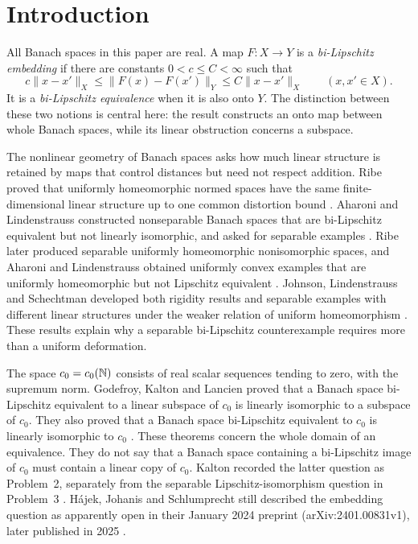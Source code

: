 \section{Introduction}\label{sec:introduction}

All Banach spaces in this paper are real. A map \(F:X\to Y\) is a
\emph{bi-Lipschitz embedding} if there are constants
\(0<c\leq C<\infty\) such that
\[
 c\|x-x'\|_X\leq\|F(x)-F(x')\|_Y
       \leq C\|x-x'\|_X\qquad(x,x'\in X).
\]
It is a \emph{bi-Lipschitz equivalence} when it is also onto \(Y\).
The distinction between these two notions is central here: the result
constructs an onto map between whole Banach spaces, while its linear
obstruction concerns a subspace.

The nonlinear geometry of Banach spaces asks how much linear structure
is retained by maps that control distances but need not respect
addition. Ribe proved that uniformly homeomorphic normed spaces have
the same finite-dimensional linear structure up to one common
distortion bound \cite[Theorem~1]{Ribe76}. Aharoni and Lindenstrauss
constructed nonseparable Banach spaces that are bi-Lipschitz equivalent
but not linearly isomorphic, and asked for separable examples
\cite[pp.~281--282]{AL78}. Ribe later produced separable uniformly
homeomorphic nonisomorphic spaces, and Aharoni and Lindenstrauss
obtained uniformly convex examples that are uniformly homeomorphic
but not Lipschitz equivalent \cite{Ribe84,AL85}.
Johnson, Lindenstrauss and Schechtman
developed both rigidity results and separable examples with different
linear structures under the weaker relation of uniform homeomorphism
\cite[Theorem~5.8 and Section~8(3)]{JLS96}. These results explain why a separable bi-Lipschitz
counterexample requires more than a uniform deformation.

The space \(c_0=c_0(\mathbb N)\) consists of real scalar sequences tending to
zero, with the supremum norm. Godefroy, Kalton and Lancien proved that a
Banach space bi-Lipschitz equivalent to a linear subspace of \(c_0\) is
linearly isomorphic to a subspace of \(c_0\). They also proved that a
Banach space bi-Lipschitz equivalent to \(c_0\) is linearly isomorphic
to \(c_0\) \cite[Theorems~2.1--2.2]{GKL00}. These theorems concern the
whole domain of an equivalence. They do not say that a Banach space
containing a bi-Lipschitz image of \(c_0\) must contain a linear copy
of \(c_0\). Kalton recorded the latter question as Problem~2, separately
from the separable Lipschitz-isomorphism question in Problem~3
\cite[pp.~21--22]{Kalton08}. H\'ajek, Johanis and Schlumprecht still described the
embedding question as apparently open in their January 2024 preprint
(arXiv:2401.00831v1), later published in 2025 \cite{HJS25}.

